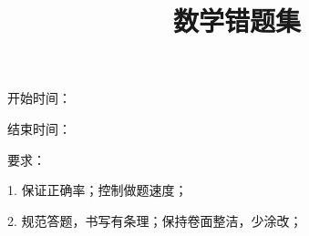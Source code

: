 \documentclass[a4paper]{ctexart}
\title{\heiti\zihao{2} 数学错题集}
\begin{document}
    \maketitle
    \centerline{开始时间：}
    \centerline{结束时间：}

    要求：
    
    1. 保证正确率；控制做题速度；

    2. 规范答题，书写有条理；保持卷面整洁，少涂改；

    
    \newpage

    \setcounter{page}{1}
    \cfoot{\thepage}

    \renewcommand{\footrulewidth}{1pt}
    \tableofcontents

    \newpage


    \setcounter{page}{1}


    \begin{sloppy}
        \begin{enumerate}
            
            
        \end{enumerate}
    \end{sloppy}
\end{document}
